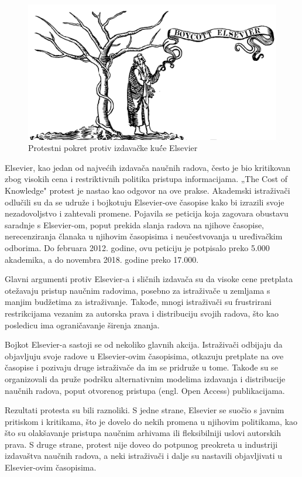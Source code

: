 \documentclass{article}
\begin{document}
\begin{figure}[htbp]
    \center
    \includegraphics[scale=0.1]{img/Boycott_Elsevier.png}
    \caption{Protestni pokret protiv izdavačke kuć́e Elsevier}
\end{figure}

Elsevier, kao jedan od najvećih izdavača naučnih radova, često je bio kritikovan zbog visokih cena i restriktivnih politika pristupa informacijama. „The Cost of Knowledge" protest je nastao kao odgovor na ove prakse. Akademski istraživači odlučili su da se udruže i bojkotuju Elsevier-ove časopise kako bi izrazili svoje nezadovoljstvo i zahtevali promene. Pojavila se peticija koja zagovara obustavu saradnje s Elsevier-om, poput prekida slanja radova na njihove časopise, nerecenziranja članaka u njihovim časopisima i neučestvovanja u uređivačkim odborima. Do februara 2012. godine, ovu peticiju je potpisalo preko 5.000 akademika, a do novembra 2018. godine preko 17.000.

Glavni argumenti protiv Elsevier-a i sličnih izdavača su da visoke cene pretplata otežavaju pristup naučnim radovima, posebno za istraživače u zemljama s manjim budžetima za istraživanje. Takođe, mnogi istraživači su frustrirani restrikcijama vezanim za autorska prava i distribuciju svojih radova, što kao posledicu ima ograničavanje širenja znanja.

Bojkot Elsevier-a sastoji se od nekoliko glavnih akcija. Istraživači odbijaju da objavljuju svoje radove u Elsevier-ovim časopisima, otkazuju pretplate na ove časopise i pozivaju druge istraživače da im se pridruže u tome. Takođe su se organizovali da pruže podršku alternativnim modelima izdavanja i distribucije naučnih radova, poput otvorenog pristupa (engl. Open Access) publikacijama.

Rezultati protesta su bili raznoliki. S jedne strane, Elsevier se suočio s javnim pritiskom i kritikama, što je dovelo do nekih promena u njihovim politikama, kao što su olakšavanje pristupa naučnim arhivama ili fleksibilniji uslovi autorskih prava. S druge strane, protest nije doveo do potpunog preokreta u industriji izdavaštva naučnih radova, a neki istraživači i dalje su nastavili objavljivati u Elsevier-ovim časopisima.
\end{document}
